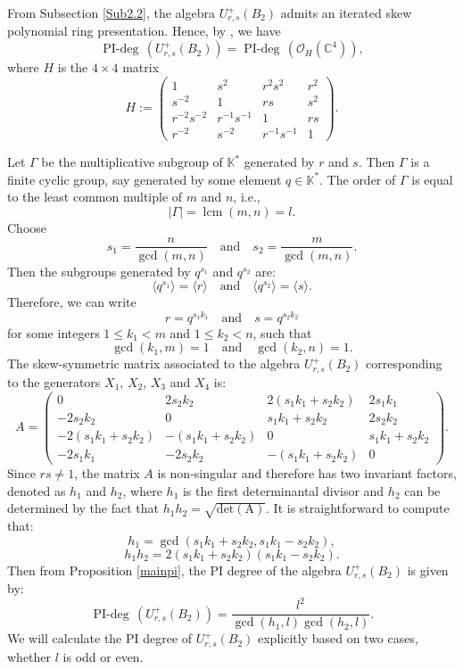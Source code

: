 \documentclass[12 pt,reqno]{amsart}
\numberwithin{equation}{section}
\DeclareMathOperator{\pideg}{PI-deg}
\theoremstyle{definition}
\theoremstyle{definition}
\theoremstyle{remark}
\theoremstyle{remark}
\begin{document}
From Subsection \ref{Sub2.2}, the algebra \( U_{r,s}^+(B_2) \) admits an iterated skew polynomial ring presentation. Hence, by \cite[Corollary~I.14.I]{brg}, we have
\[
\pideg\,\left(U_{r,s}^+(B_2)\right) 
= \pideg\,\left(\mathcal{O}_{H}(\mathbb{C}^4)\right),
\]
where \( H \) is the \(4 \times 4\) matrix
\[
H := \begin{pmatrix}
  1 & s^2 & r^2 s^2 & r^2 \\
  s^{-2} & 1 & r s & s^2 \\
  r^{-2} s^{-2} & r^{-1} s^{-1} & 1 & r s \\
  r^{-2} & s^{-2} & r^{-1} s^{-1} & 1
\end{pmatrix}.
\]

Let $\Gamma$ be the multiplicative subgroup of $\mathbb{K}^*$ generated by $r$ and $s$. Then $\Gamma$ is a finite cyclic group, say generated by some element $q \in \mathbb{K}^*$. The order of $\Gamma$ is equal to the least common multiple of $m$ and $n$, i.e.,
$$
|\Gamma| = \operatorname{lcm}(m, n) = l.
$$
Choose
$$
s_1 = \frac{n}{\gcd(m, n)} \quad \text{and} \quad s_2 = \frac{m}{\gcd(m, n)}.
$$
Then the subgroups generated by $ q^{s_1} $ and $ q^{s_2} $ are:
$$
\langle q^{s_1} \rangle = \langle r \rangle \quad \text{and} \quad \langle q^{s_2} \rangle = \langle s \rangle.
$$
Therefore, we can write 
$$
r = q^{s_1 k_1} \quad \text{and} \quad s = q^{s_2 k_2}
$$
for some integers $ 1 \leq k_1 < m $ and $ 1 \leq k_2 < n $, such that 
$$
\gcd(k_1, m) = 1 \quad \text{and} \quad \gcd(k_2, n) = 1.
$$
The skew-symmetric matrix associated to the algebra $ U_{r,s}^+(B_2)$ corresponding to the generators $X_1$, $X_2$, $X_3$ and $X_4$ is:
$$
A=\begin{pmatrix}
0 & 2s_2k_2 & 2(s_1k_1 + s_2k_2) & 2s_1k_1 \\
-2s_2k_2 & 0 & s_1k_1 + s_2k_2 & 2s_2k_2 \\
-2(s_1k_1 + s_2k_2) & -(s_1k_1 + s_2k_2) & 0 & s_1k_1 + s_2k_2 \\
-2s_1k_1 & -2s_2k_2 & -(s_1k_1 + s_2k_2) & 0
\end{pmatrix}.
$$
Since $rs\neq 1$, the matrix $A$ is non-singular and therefore has two invariant factors, denoted as $h_1$ and $h_2$, where $h_1$ is the first determinantal divisor and $h_2$ can be determined by the fact that $h_1h_2=\sqrt{\operatorname{det (A)}}$. It is straightforward to compute that: 
\begin{equation}\label{eq3.1} h_1=\gcd(s_1k_1+s_2k_2, s_1k_1-s_2k_2),\end{equation}  \begin{equation}\label{eq3.2}
    h_1h_2= 2(s_1k_1+s_2k_2)(s_1k_1-s_2k_2).\end{equation}
Then from Proposition \ref{mainpi}, the PI degree of the algebra $ U_{r,s}^+(B_2)$ is given by:
\begin{equation}\label{eq3.3}
\operatorname{PI-deg}\,  \left(U_{r,s}^+(B_2)\right)= \frac{l^2}{\gcd(h_1,l)\gcd(h_2,l)}.
\end{equation}
We will calculate the PI degree of $U_{r,s}^+(B_2)$ explicitly based on two cases, whether $l$ is odd or even.
\end{document}
